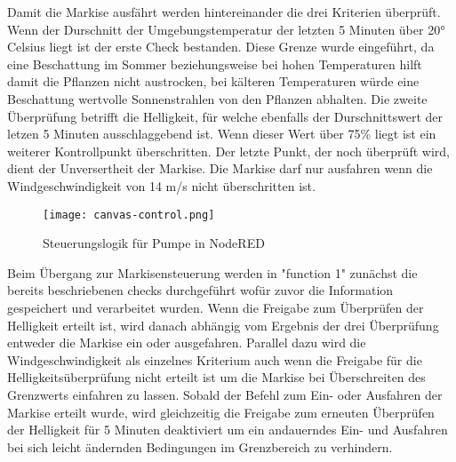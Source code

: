 Damit die Markise ausfährt werden hintereinander die drei Kriterien überprüft. Wenn der Durschnitt der Umgebungstemperatur der letzten 5 Minuten über 20° Celsius liegt ist der erste Check bestanden. Diese Grenze wurde eingeführt, da eine Beschattung im Sommer beziehungsweise bei hohen Temperaturen hilft damit die Pflanzen nicht austrocken, bei kälteren Temperaturen würde eine Beschattung wertvolle Sonnenstrahlen von den Pflanzen abhalten.
Die zweite Überprüfung betrifft die Helligkeit, für welche ebenfalls der Durschnittswert der letzen 5 Minuten ausschlaggebend ist. Wenn dieser Wert über 75\% liegt ist ein weiterer Kontrollpunkt überschritten.
Der letzte Punkt, der noch überprüft wird, dient der Unversertheit der Markise. Die Markise darf nur ausfahren wenn die Windgeschwindigkeit von 14 m/s nicht überschritten ist.

\begin{figure}[h]
  \centering
  \texttt{[image: canvas-control.png]}
  \caption{Steuerungslogik für Pumpe in NodeRED}\label{fig:canvas-activation}
\end{figure}

Beim Übergang zur Markisensteuerung werden in "function 1" zunächst die bereits beschriebenen checks durchgeführt wofür zuvor die Information gespeichert und verarbeitet wurden. Wenn die Freigabe zum Überprüfen der Helligkeit erteilt ist, wird danach abhängig vom Ergebnis der drei Überprüfung entweder die Markise ein oder ausgefahren. Parallel dazu wird die Windgeschwindigkeit als einzelnes Kriterium auch wenn die Freigabe für die Helligkeitsüberprüfung nicht erteilt ist um die Markise bei Überschreiten des Grenzwerts einfahren zu lassen.
Sobald der Befehl zum Ein- oder Ausfahren der Markise erteilt wurde, wird gleichzeitig die Freigabe zum erneuten Überprüfen der Helligkeit für 5 Minuten deaktiviert um ein andauerndes Ein- und Ausfahren bei sich leicht ändernden Bedingungen im Grenzbereich zu verhindern.